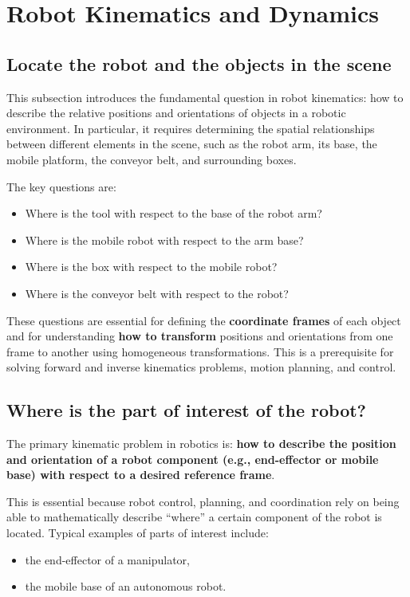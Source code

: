 \section{Robot Kinematics and Dynamics}

\subsection{Locate the robot and the objects in the scene}

This subsection introduces the fundamental question in robot kinematics: how to describe the relative positions and orientations of objects in a robotic environment. In particular, it requires determining the spatial relationships between different elements in the scene, such as the robot arm, its base, the mobile platform, the conveyor belt, and surrounding boxes.

The key questions are:

\begin{itemize}
  \item Where is the tool with respect to the base of the robot arm?
  \item Where is the mobile robot with respect to the arm base?
  \item Where is the box with respect to the mobile robot?
  \item Where is the conveyor belt with respect to the robot?
\end{itemize}

These questions are essential for defining the \textbf{coordinate frames} of each object and for understanding \textbf{how to transform} positions and orientations from one frame to another using homogeneous transformations. This is a prerequisite for solving forward and inverse kinematics problems, motion planning, and control.

\hfill

\subsection{Where is the part of interest of the robot?}

The primary kinematic problem in robotics is: \textbf{how to describe the position and orientation of a robot component (e.g., end-effector or mobile base) with respect to a desired reference frame}.

This is essential because robot control, planning, and coordination rely on being able to mathematically describe “where” a certain component of the robot is located. Typical examples of parts of interest include:
\begin{itemize}
  \item the end-effector of a manipulator,
  \item the mobile base of an autonomous robot.
\end{itemize}

